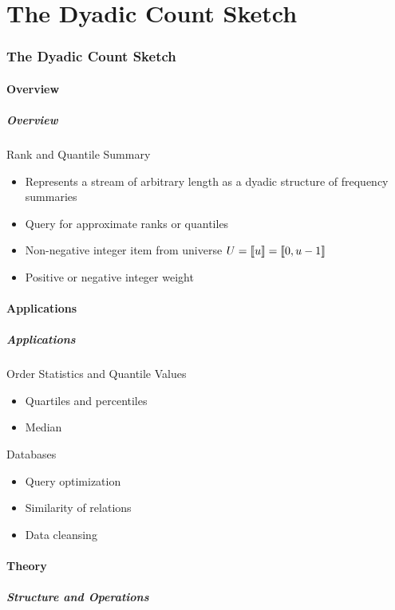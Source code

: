 \part{The Dyadic Count Sketch}

\section{The Dyadic Count Sketch}

\subsection{Overview}

\begin{frame}
  \frametitle{Overview}

  \begin{block}{Rank and Quantile Summary}
    \begin{itemize}
      \item Represents a stream of arbitrary length as a dyadic structure of frequency summaries
      \item Query for approximate ranks or quantiles
      \item Non-negative integer item from universe \( U = \llbracket u\rrbracket = \llbracket0, u - 1\rrbracket \)
      \item Positive or negative integer weight
    \end{itemize}
  \end{block}
\end{frame}

\subsection{Applications}

\begin{frame}
  \frametitle{Applications}

  \begin{block}{Order Statistics and Quantile Values}
    \begin{itemize}
      \item Quartiles and percentiles
      \item Median
    \end{itemize}
  \end{block}

  \begin{block}{Databases}
    \begin{itemize}
      \item Query optimization
      \item Similarity of relations
      \item Data cleansing
    \end{itemize}
  \end{block}
\end{frame}

\subsection{Theory}

\begin{frame}
  \frametitle{Structure and Operations}

  \begin{figure}
    \centering
    
  \end{figure}
\end{frame}
